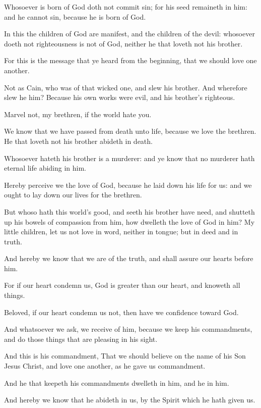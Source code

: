 \Verse Whosoever is born of God doth not commit sin; for his seed remaineth in him: and he cannot sin, because he is born of God.

\Verse In this the children of God are manifest, and the children of the devil: whosoever doeth not righteousness is not of God, neither he that loveth not his brother.

\Verse For this is the message that ye heard from the beginning, that we should love one another.

\Verse Not as Cain, who was of that wicked one, and slew his brother.  And wherefore slew he him? Because his own works were evil, and his brother's righteous.

\Verse Marvel not, my brethren, if the world hate you.

\Verse We know that we have passed from death unto life, because we love the brethren. He that loveth not his brother abideth in death.

\Verse Whosoever hateth his brother is a murderer: and ye know that no murderer hath eternal life abiding in him.

\Verse Hereby perceive we the love of God, because he laid down his life for us: and we ought to lay down our lives for the brethren.

\Verse But whoso hath this world's good, and seeth his brother have need, and shutteth up his bowels of compassion from him, how dwelleth the love of God in him?  \Verse My little children, let us not love in word, neither in tongue; but in deed and in truth.

\Verse And hereby we know that we are of the truth, and shall assure our hearts before him.

\Verse For if our heart condemn us, God is greater than our heart, and knoweth all things.

\Verse Beloved, if our heart condemn us not, then have we confidence toward God.

\Verse And whatsoever we ask, we receive of him, because we keep his commandments, and do those things that are pleasing in his sight.

\Verse And this is his commandment, That we should believe on the name of his Son Jesus Christ, and love one another, as he gave us commandment.

\Verse And he that keepeth his commandments dwelleth in him, and he in him.

And hereby we know that he abideth in us, by the Spirit which he hath given us.


